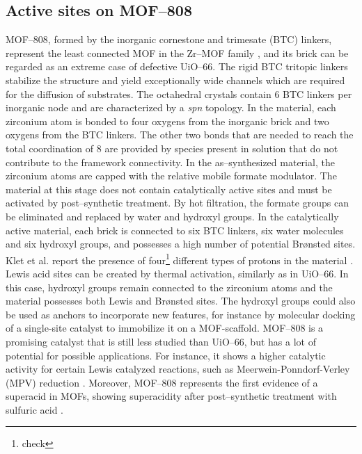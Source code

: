 \subsection*{Active sites on MOF--808}
MOF--808, formed by the inorganic  cornestone and trimesate (BTC) linkers, represent the least connected MOF in the Zr--MOF family \cite{furukawa2014water}, and its brick can be regarded as an extreme case of defective UiO--66. The rigid BTC tritopic linkers stabilize the structure and yield exceptionally wide channels which are required for the diffusion of substrates. The octahedral crystals contain 6 BTC linkers per inorganic node and are characterized by a \textit{spn} topology. 
In the material, each zirconium atom is bonded to four oxygens from the inorganic brick and two oxygens from the BTC linkers. The other two bonds that are needed to reach the total coordination of 8 are provided by species present in solution that do not contribute to the framework connectivity. 
\npar
In the as--synthesized material, the zirconium atoms are capped with the relative mobile formate modulator. The material at this stage does not contain catalytically active sites and must be activated by post--synthetic treatment. By hot filtration, the formate groups can be eliminated and replaced by water and hydroxyl groups. In the catalytically active material, each brick is connected to six BTC linkers, six water molecules and six hydroxyl groups, and possesses a high number of potential Br\o{}nsted sites. Klet et al. report the presence of four\footnote{check} different types of protons in the material \cite{klet2016evaluation}. Lewis acid sites can be created by thermal activation, similarly as in UiO--66. In this case, hydroxyl groups remain connected to the zirconium atoms and the material possesses both Lewis and Br\o{}nsted sites. The hydroxyl groups could also be used as anchors to incorporate new features, for instance by molecular docking of a single-site catalyst to immobilize it on a MOF-scaffold. MOF--808 is a promising catalyst that is still less studied than UiO--66, but has a lot of potential for possible applications. For instance, it shows a higher catalytic activity for certain Lewis catalyzed reactions, such as Meerwein-Ponndorf-Verley (MPV) reduction \cite{plessers2016zr, mautschke2018catalytic}. 
Moreover, MOF--808 represents the first evidence of a superacid in MOFs, showing superacidity after post--synthetic treatment with sulfuric acid \cite{jiang2014superacidity}.

